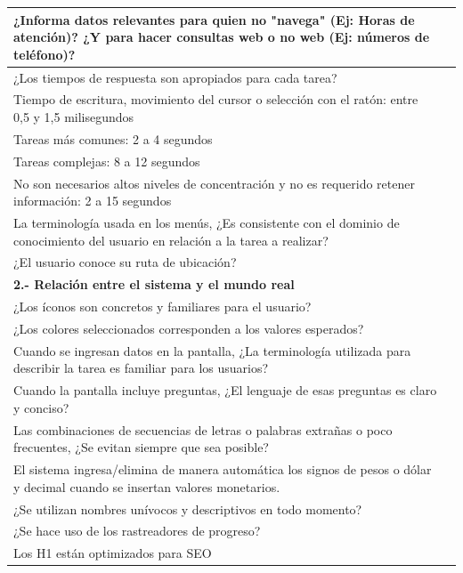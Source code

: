 \documentclass[stu, 12pt, letterpaper, donotrepeattitle, floatsintext, natbib]{apa7}
\begin{document}
\begin{longtable}{|>{\raggedright\arraybackslash}p{10cm}|>{\centering\arraybackslash}p{3cm}|}
    ¿Informa datos relevantes para quien no "navega" (Ej: Horas de atención)? ¿Y para hacer consultas web o no web (Ej: números de teléfono)? & \\ \hline
    ¿Los tiempos de respuesta son apropiados para cada tarea? & \\ \hline
    Tiempo de escritura, movimiento del cursor o selección con el ratón: entre 0,5 y 1,5 milisegundos & \\ \hline
    Tareas más comunes: 2 a 4 segundos & \\ \hline
    Tareas complejas: 8 a 12 segundos & \\ \hline
    No son necesarios altos niveles de concentración y no es requerido retener información: 2 a 15 segundos & \\ \hline
    La terminología usada en los menús, ¿Es consistente con el dominio de conocimiento del usuario en relación a la tarea a realizar? & \\ \hline
    ¿El usuario conoce su ruta de ubicación? & \\ \hline
    
    \textbf{2.- Relación entre el sistema y el mundo real} & \\ \hline
    ¿Los íconos son concretos y familiares para el usuario? & \\ \hline
    ¿Los colores seleccionados corresponden a los valores esperados? & \\ \hline
    Cuando se ingresan datos en la pantalla, ¿La terminología utilizada para describir la tarea es familiar para los usuarios? & \\ \hline
    Cuando la pantalla incluye preguntas, ¿El lenguaje de esas preguntas es claro y conciso? & \\ \hline
    Las combinaciones de secuencias de letras o palabras extrañas o poco frecuentes, ¿Se evitan siempre que sea posible? & \\ \hline
    El sistema ingresa/elimina de manera automática los signos de pesos o dólar y decimal cuando se insertan valores monetarios. & \\ \hline
    ¿Se utilizan nombres unívocos y descriptivos en todo momento? & \\ \hline
    ¿Se hace uso de los rastreadores de progreso? & \\ \hline
    Los H1 están optimizados para SEO & \\ \hline
    

\end{longtable}
\end{document}
